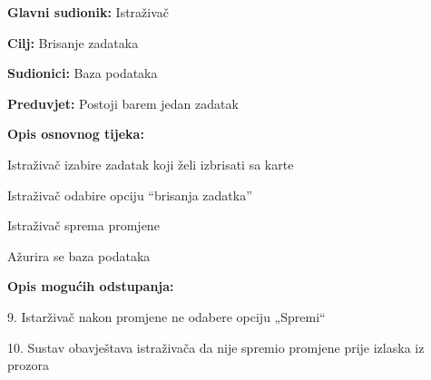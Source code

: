 					\noindent {}
					\begin{packed_item}
	
						\item \textbf{Glavni sudionik: } Istraživač
						\item  \textbf{Cilj:} Brisanje zadataka
						\item  \textbf{Sudionici:} Baza podataka
						\item  \textbf{Preduvjet:} Postoji barem jedan zadatak
						\item  \textbf{Opis osnovnog tijeka:}
						
						\item[] \begin{packed_enum}
	
							\item 	Istraživač izabire zadatak koji želi izbrisati sa karte
							\item 	Istraživač odabire opciju “brisanja zadatka”
							\item 	Istraživač sprema promjene
							\item 	Ažurira se baza podataka
							
							
						\end{packed_enum}

						\item  \textbf{Opis mogućih odstupanja:}
						
						\item[] \begin{packed_item}
	
							\item[4.a] 9.	Istarživač nakon promjene ne odabere opciju „Spremi“
							\item[] \begin{packed_enum}
								
								\item 10.	Sustav obavještava istraživača da nije spremio promjene prije izlaska iz prozora 
								
							\end{packed_enum}

						\end{packed_item}
					\end{packed_item}%
